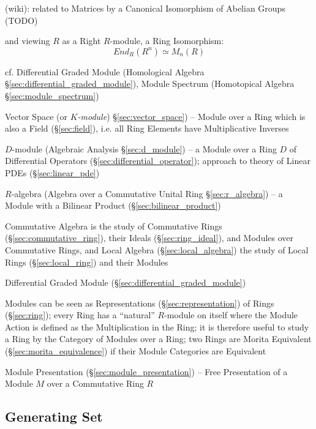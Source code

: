 (wiki): related to Matrices by a Canonical Isomorphism of Abelian Groups (TODO)

and viewing $R$ as a Right $R$-module, a Ring Isomorphism:
\[
  End_R(R^n) \simeq M_n(R)
\]

cf. Differential Graded Module (Homological Algebra
\S\ref{sec:differential_graded_module}), Module Spectrum (Homotopical Algebra
\S\ref{sec:module_spectrum})

\fist Vector Space (or \emph{$K$-module}) \S\ref{sec:vector_space}) -- Module
over a Ring which is also a Field (\S\ref{sec:field}), i.e. all Ring Elements
have Multiplicative Inverses

\fist $D$-module (Algebraic Analysis \S\ref{sec:d_module}) -- a Module over a
Ring $D$ of Differential Operators (\S\ref{sec:differential_operator}); approach
to theory of Linear PDEs (\S\ref{sec:linear_pde})

\fist $R$-algebra (Algebra over a Commutative Unital Ring \S\ref{sec:r_algebra})
-- a Module with a Bilinear Product (\S\ref{sec:bilinear_product})

\fist Commutative Algebra is the study of Commutative Rings
(\S\ref{sec:commutative_ring}), their Ideals (\S\ref{sec:ring_ideal}), and
Modules over Commutative Rings, and Local Algebra (\S\ref{sec:local_algebra})
the study of Local Rings (\S\ref{sec:local_ring}) and their Modules

\fist Differential Graded Module (\S\ref{sec:differential_graded_module})

Modules can be seen as Representations (\S\ref{sec:representation}) of Rings
(\S\ref{sec:ring}); every Ring has a ``natural'' $R$-module on itself where the
Module Action is defined as the Multiplication in the Ring; it is therefore
useful to study a Ring by the Category of Modules over a Ring; two Rings are
Morita Equivalent (\S\ref{sec:morita_equivalence}) if their Module Categories
are Equivalent

\fist Module Presentation (\S\ref{sec:module_presentation}) -- Free Presentation
of a Module $M$ over a Commutative Ring $R$



\subsection{Generating Set}\label{sec:generating_set}

